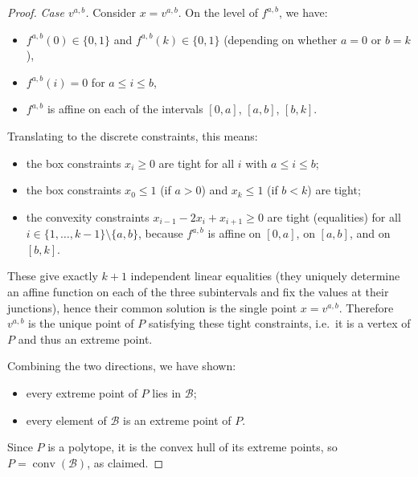 \begin{proof}
    \smallskip
    \emph{Case $v^{a,b}$.}
    Consider $x=v^{a,b}$.
    On the level of $f^{a,b}$, we have:
    \begin{itemize}
        \item $f^{a,b}(0)\in\{0,1\}$ and $f^{a,b}(k)\in\{0,1\}$ (depending on whether $a=0$ or $b=k$),
        \item $f^{a,b}(i)=0$ for $a\le i\le b$,
        \item $f^{a,b}$ is affine on each of the intervals $[0,a]$, $[a,b]$, $[b,k]$.
    \end{itemize}
    Translating to the discrete constraints, this means:
    \begin{itemize}
        \item the box constraints $x_i\ge0$ are tight for all $i$ with $a\le i\le b$;
        \item the box constraints $x_0\le1$ (if $a>0$) and $x_k\le1$ (if $b<k$) are tight;
        \item the convexity constraints $x_{i-1}-2x_i+x_{i+1}\ge0$ are tight (equalities) for all $i\in\{1,\dots,k-1\}\setminus\{a,b\}$, because $f^{a,b}$ is affine on $[0,a]$, on $[a,b]$, and on $[b,k]$.
    \end{itemize}
    These give exactly $k+1$ independent linear equalities (they uniquely determine an affine function on each of the three subintervals and fix the values at their junctions), hence their common solution is the single point $x=v^{a,b}$.
    Therefore $v^{a,b}$ is the unique point of $P$ satisfying these tight constraints, i.e.\ it is a vertex of $P$ and thus an extreme point.

    \smallskip
    Combining the two directions, we have shown:
    \begin{itemize}
        \item every extreme point of $P$ lies in $\mathcal{B}$;
        \item every element of $\mathcal{B}$ is an extreme point of $P$.
    \end{itemize}
    Since $P$ is a polytope, it is the convex hull of its extreme points, so $P=\operatorname{conv}(\mathcal{B})$, as claimed.
\end{proof}
